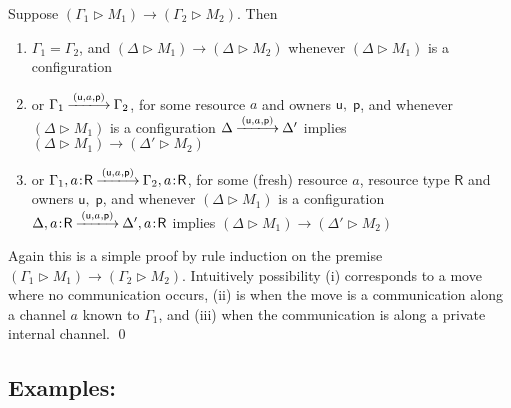 \documentclass{LMCS}
\newcommand{\pfn}[1]{\mathsf{#1}}  \newcommand{\cfn}[1]{\mathsf{#1}}  \newcommand{\ownfnt}[1]{{\mathsf{#1}}}
\newcommand{\with}{\mathbin \rhd}
\newcommand{\cancom}[3]{({\ownfnt{#1}},{#2},{\ownfnt{#3}}) \xspace}
\newcommand{\typeletter}[1]{{\mathsf{#1}}}
\newcommand{\tR}{\typeletter{R}}
\newcommand{\Cassoc}[2]{ {{#1}\kern -0.2em : \kern -0.2em {#2}}}
\newcommand{\ar}[1]{\mathbin{\xlongrightarrow{ #1}}}
\newcommand{\smalleval}{\longrightarrow}  \newcommand{\csmalleval}[1]{\longrightarrow^{#1}}
\begin{document}
\begin{prop}\label{prop:red}
  Suppose $(\Gamma_1 \with M_1) \smalleval (\Gamma_2 \with M_2)$. Then 
  \begin{enumerate}[\em(i)]
  \item $\Gamma_1 = \Gamma_2$, and $(\Delta \with M_1) \smalleval (\Delta \with M_2)$ whenever $(\Delta \with M_1)$ is a
        configuration
  \item or $\Gamma_1 \ar{\cancom{u}{a}{p}} \Gamma_2$, for some resource $a$ and owners ${\ownfnt u,\;  \ownfnt p}$,
            and whenever $(\Delta \with M_1)$ is a
        configuration $\Delta \ar{\cancom{u}{a}{p}} \Delta'$ implies  $(\Delta \with M_1) \smalleval (\Delta' \with M_2)$
  \item or $\Gamma_1,\Cassoc{a}{\tR} \ar{\cancom{u}{a}{p}} \Gamma_2, \Cassoc{a}{\tR}$, for some (fresh) resource $a$, resource type
$\tR$  and owners ${\ownfnt u,\;  \ownfnt p}$, and whenever $(\Delta \with M_1)$ is a
        configuration
       $\Delta,\Cassoc{a}{\tR} \ar{\cancom{u}{a}{p}} \Delta', \Cassoc{a}{\tR}$ implies 
         $(\Delta \with M_1) \smalleval (\Delta' \with M_2)$
  \end{enumerate}
\end{prop}
\proof
Again this is a simple proof by rule induction on the premise
$(\Gamma_1 \with M_1) \smalleval (\Gamma_2 \with M_2)$.  Intuitively possibility (i) corresponds to a move
where no communication occurs, (ii) is when the move is a communication along a channel $a$ known to $\Gamma_1$,
and (iii) when the communication is along a private internal channel. 
\qed

\subsection{Examples:}\label{sec:examples1}

\newcommand{\Reader}{\pfn{Reader}}
\newcommand{\Store}{\pfn{Store}}
\newcommand{\Library}{\pfn{Library}}
\newcommand{\Sys}{\pfn{Sys}}
\newcommand{\UD}{\pfn{UD}}
\newcommand{\Lib}{\pfn{Lib}}
\newcommand{\GB}{\pfn{Book}}

\newcommand{\local}{\pfn{local}}
\newcommand{\central}{\pfn{central}}

\newcommand{\goLib}{\cfn{goLib}}
\newcommand{\goHome}{\cfn{goHome}}
\newcommand{\reqR}{\cfn{reqR}}
\newcommand{\reqS}{\cfn{reqS}}
\newcommand{\Cname}{\cfn{name}}
\newcommand{\Cbook}{\cfn{book}\xspace}
\newcommand{\Creq}{\cfn{req}}

\newcommand{\Cpublic}{\ownfnt{pub}}
\newcommand{\Clib}{\ownfnt{lib}}
\newcommand{\kate}{\ownfnt{kate}}
\newcommand{\dad}{\ownfnt{dad}}
\end{document}
